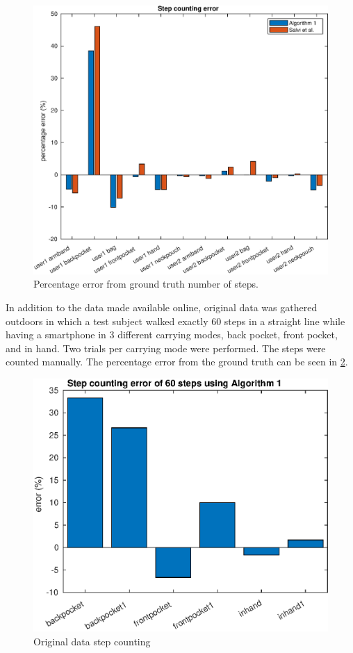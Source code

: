 	\begin{figure}[H]
		\centering
		\includegraphics[width=0.7\linewidth]{images/20201112_1401_Step_counting_error}
		\caption{Percentage error from ground truth number of steps. }
		\setlength{\belowcaptionskip}{-2cm}
		\label{fig:sd_percent_comparison}
	\end{figure}
In addition to the data made available online, original data was gathered outdoors in which a test subject walked exactly 60 steps in a straight line while having a smartphone in 3 different carrying modes, back pocket, front pocket, and in hand. Two trials per carrying mode were performed. The steps were counted manually. The percentage error from the ground truth can be seen in \cref{fig:202009291013step_counting_error_of_60_steps}.
\begin{figure}[H]
	\centering
	\includegraphics[width=0.6\linewidth]{images/20201112_1406_Step_counting_error_of_60_steps_using_Algorithm_1}
	\setlength{\belowcaptionskip}{-20pt}
	\caption{Original data step counting}
	\label{fig:202009291013step_counting_error_of_60_steps}
\end{figure}

